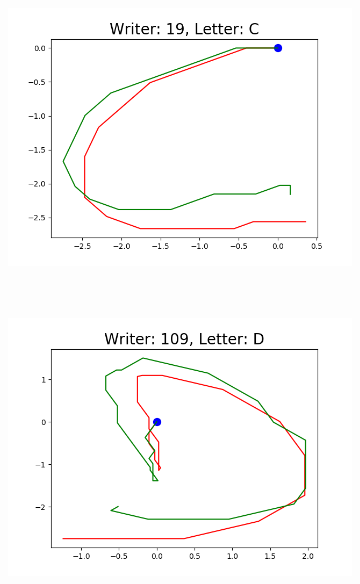\begin{figure}
\begin{subfigure}[b]{0.17\textwidth}
          \includegraphics[width=\textwidth]{images/framework/comparison_figures/C_19.png}
      \end{subfigure}
      ~
      \begin{subfigure}[b]{0.17\textwidth}
          \includegraphics[width=\textwidth]{images/framework/comparison_figures/D_109.png}
      \end{subfigure}
      ~
      \begin{subfigure}[b]{0.17\textwidth}

\end{subfigure}
\end{figure}
